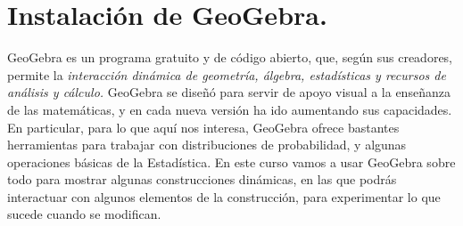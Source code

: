 \documentclass[10pt,a4paper]{article}
\begin{document}
\section{Instalación de GeoGebra.}
\label{tut00:sec:InstalacionGeoGebra}

GeoGebra  es un programa gratuito y de código abierto, que, según sus creadores, permite la {\em
interacción dinámica de geometría, álgebra, estadísticas y recursos de análisis y cálculo.}
GeoGebra  se diseñó para servir de apoyo visual a la enseñanza de las matemáticas, y en cada nueva
versión ha ido aumentando sus capacidades. En particular, para lo que aquí nos interesa,  GeoGebra
ofrece bastantes herramientas para trabajar con distribuciones de probabilidad, y algunas
operaciones básicas de la Estadística. En este curso vamos a usar  GeoGebra  sobre todo para
mostrar algunas construcciones dinámicas, en las que podrás interactuar con algunos elementos de la
construcción, para experimentar lo que sucede cuando se modifican.
\end{document}
